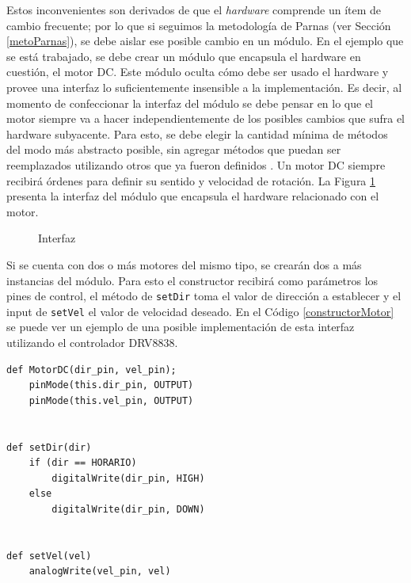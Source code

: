 Estos inconvenientes son derivados de que el \textit{hardware} comprende un ítem de cambio frecuente; por lo que si seguimos la metodología de Parnas (ver Sección \ref{metoParnas}), se debe aislar ese posible cambio en un módulo. En el ejemplo que se está trabajado, se debe crear un módulo que encapsula el hardware en cuestión, el motor \gls{DC}. Este módulo oculta cómo debe ser usado el hardware y provee una interfaz lo suficientemente insensible a la implementación. Es decir, al momento de confeccionar la interfaz del módulo se debe pensar en lo que el motor siempre va a hacer independientemente de los posibles cambios que sufra el hardware subyacente. Para esto, se debe elegir la cantidad mínima de métodos del modo más abstracto posible, sin agregar métodos que puedan ser reemplazados utilizando otros que ya fueron definidos \cite{Parnas02, parnas1977abstract}.
Un motor \gls{DC} siempre recibirá órdenes para definir su sentido y velocidad de rotación. La Figura \ref{interfazMotor} presenta la interfaz del módulo \MotorDC que encapsula el hardware relacionado con el motor.

\begin{figure}[H]
\caption{Interfaz \MotorDC}
\label{interfazMotor}
\begin{center}
\end{center}
\end{figure}

Si se cuenta con dos o más motores del mismo tipo, se crearán dos a más instancias del módulo. Para esto el constructor recibirá como parámetros los pines de control, el método de \verb|setDir| toma el valor de dirección a establecer y el input de \verb|setVel| el valor de velocidad deseado. En el Código \ref{constructorMotor} se puede ver un ejemplo de una posible implementación de esta interfaz utilizando el controlador \gls{DRV8838}.

\newpage

\begin{lstlisting}[caption=Posible implementación de la interfaz del módulo MotorDC.,label={constructorMotor}]
def MotorDC(dir_pin, vel_pin);
    pinMode(this.dir_pin, OUTPUT)
    pinMode(this.vel_pin, OUTPUT)


def setDir(dir) 
    if (dir == HORARIO)
        digitalWrite(dir_pin, HIGH)
    else
        digitalWrite(dir_pin, DOWN)
        

def setVel(vel)
    analogWrite(vel_pin, vel)

\end{lstlisting}

